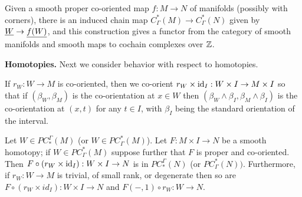 \begin{corollary}
Given a smooth proper co-oriented map $f \colon M \to N$ of manifolds (possibly with corners), there is an induced chain map $C^*_\Gamma(M) \to C^*_\Gamma(N)$ given by $\underline{W} \to \underline{f(W)}$, and this construction gives a functor from the category of smooth manifolds and smooth maps to cochain complexes over $\mathbb{Z}$.
\end{corollary}



\noindent\textbf{Homotopies.} Next we consider behavior with respect to homotopies.

\begin{convention}
If $r_W \colon W \to M$ is co-oriented, then we co-orient $r_W \times \mathrm{id}_I:W \times I \to M \times I$ so that if $(\beta_W,\beta_M)$ is the co-orientation at $x \in W$ then $(\beta_W \wedge \beta_I,\beta_M \wedge \beta_I)$ is the co-orientation at $(x,t)$ for any $t \in I$, with $\beta_I$ being the standard orientation of the interval.
\end{convention}


\begin{lemma} \label{L: dessicated homotopy}
	Let $W \in PC_*^\Gamma(M)$ (or $W \in PC^*_\Gamma(M)$).
Let $F \colon M \times I \to N$ be a smooth homotopy; if $W \in PC^*_\Gamma(M)$ suppose further that $F$ is proper and co-oriented. Then $F\circ (r_W \times \mathrm{id}_I):W \times I \to N$ is in $PC_*^\Gamma(N)$ (or $PC^*_\Gamma(N))$. Furthermore,
if $r_W: W \to M$ is trivial, of small rank, or
	degenerate then so are
	$F \circ (r_W \times id_I) \colon W \times I \to N$ and $F(-,1)\circ r_W: W \to N$.
\end{lemma}

